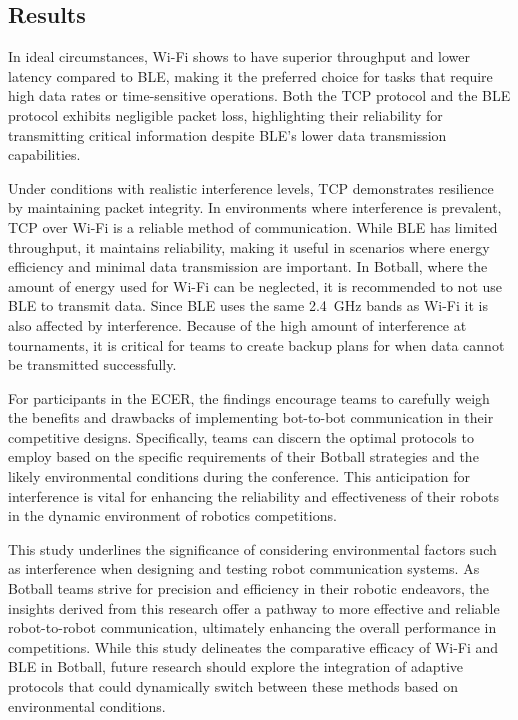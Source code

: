 \subsection{Results}
In ideal circumstances, Wi-Fi shows to have superior throughput and lower latency compared to BLE, making it the preferred choice for tasks that require high data rates or time-sensitive operations.
Both the TCP protocol and the BLE protocol exhibits negligible packet loss, highlighting their reliability for transmitting critical information despite BLE's lower data transmission capabilities.

Under conditions with realistic interference levels, TCP demonstrates resilience by maintaining packet integrity.
In environments where interference is prevalent, TCP over Wi-Fi is a reliable method of communication.
While BLE has limited throughput, it maintains reliability, making it useful in scenarios where energy efficiency and minimal data transmission are important.
In Botball, where the amount of energy used for Wi-Fi can be neglected, it is recommended to not use BLE to transmit data.
Since BLE uses the same 2.4~GHz bands as Wi-Fi it is also affected by interference.
Because of the high amount of interference at tournaments, it is critical for teams to create backup plans for when data cannot be transmitted successfully.

For participants in the ECER, the findings encourage teams to carefully weigh the benefits and drawbacks of implementing bot-to-bot communication in their competitive designs.
Specifically, teams can discern the optimal protocols to employ based on the specific requirements of their Botball strategies and the likely environmental conditions during the conference.
This anticipation for interference is vital for enhancing the reliability and effectiveness of their robots in the dynamic environment of robotics competitions.

This study underlines the significance of considering environmental factors such as interference when designing and testing robot communication systems.
As Botball teams strive for precision and efficiency in their robotic endeavors, the insights derived from this research offer a pathway to more effective and reliable robot-to-robot communication, ultimately enhancing the overall performance in competitions.
While this study delineates the comparative efficacy of Wi-Fi and BLE in Botball, future research should explore the integration of adaptive protocols that could dynamically switch between these methods based on environmental conditions.
\filbreak